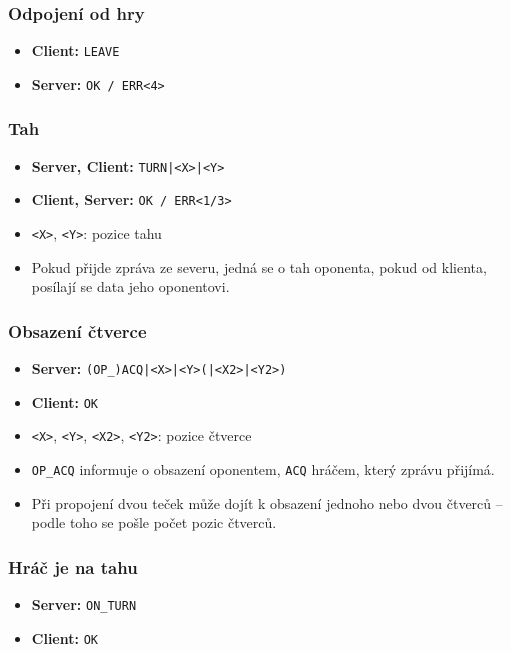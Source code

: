 \documentclass[11pt,a4paper]{article}
\begin{document}
\subsubsection*{Odpojení od hry}
\begin{itemize}
	\item \textbf{Client:} \texttt{LEAVE}
	\item \textbf{Server:} \texttt{OK / ERR<4>}
\end{itemize}

\subsubsection*{Tah}
\begin{itemize}
	\item \textbf{Server, Client:} \texttt{TURN|<X>|<Y>}
	\item \textbf{Client, Server:} \texttt{OK / ERR<1/3>}
	\item \texttt{<X>}, \texttt{<Y>}: pozice tahu
	\item Pokud přijde zpráva ze severu, jedná se o tah oponenta, pokud od klienta, posílají se data jeho oponentovi.
\end{itemize}

\subsubsection*{Obsazení čtverce}
\begin{itemize}
	\item \textbf{Server:} \texttt{(OP\_)ACQ|<X>|<Y>(|<X2>|<Y2>)}
	\item \textbf{Client:} \texttt{OK}
	\item \texttt{<X>}, \texttt{<Y>}, \texttt{<X2>}, \texttt{<Y2>}: pozice čtverce
	\item \texttt{OP\_ACQ} informuje o obsazení oponentem, \texttt{ACQ} hráčem, který zprávu přijímá.
	\item Při propojení dvou teček může dojít k obsazení jednoho nebo dvou čtverců -- podle toho se pošle počet pozic čtverců.
\end{itemize}

\subsubsection*{Hráč je na tahu}
\begin{itemize}
	\item \textbf{Server:} \texttt{ON\_TURN}
	\item \textbf{Client:} \texttt{OK}
\end{itemize}
\end{document}
